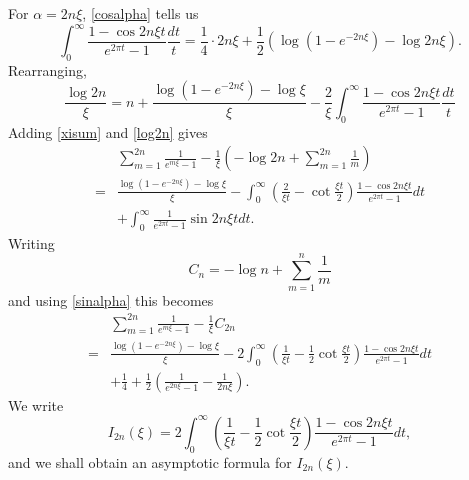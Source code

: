 \documentclass{article}
\begin{document}
For $\alpha = 2n\xi$, \eqref{cosalpha} tells us
\[
\int_0^\infty \frac{1-\cos 2n\xi t}{e^{2\pi t}-1} \frac{dt}{t} = \frac{1}{4}\cdot 2n\xi + \frac{1}{2}\left( \log(1-e^{-2n\xi})-\log 2n\xi\right).
\]
Rearranging, 
\begin{equation}
\frac{\log 2n}{\xi} = n + \frac{\log(1-e^{-2n \xi})-\log \xi}{\xi} -\frac{2}{\xi}
\int_0^\infty \frac{1-\cos 2n\xi t}{e^{2\pi t}-1} \frac{dt}{t}
\label{log2n}
\end{equation}
Adding \eqref{xisum} and \eqref{log2n} gives
\[
\begin{split}
&\sum_{m=1}^{2n} \frac{1}{e^{m\xi}-1} - \frac{1}{\xi} \left( - \log 2n+\sum_{m=1}^{2n} \frac{1}{m}  \right)\\
=& \frac{\log(1-e^{-2n \xi})-\log \xi}{\xi}
-\int_0^\infty \left(\frac{2}{\xi t}-\cot \frac{\xi t}{2} \right) \frac{1-\cos 2n\xi t}{e^{2\pi t}-1} dt\\
&+\int_0^\infty \frac{1}{e^{2\pi t}-1}  \sin 2n\xi t dt.
\end{split}
\]
Writing
\[
C_n = -\log n + \sum_{m=1}^n \frac{1}{m}
\]
and using \eqref{sinalpha} this becomes
\[
\begin{split}
&\sum_{m=1}^{2n} \frac{1}{e^{m\xi}-1} - \frac{1}{\xi} C_{2n}\\
=&\frac{\log(1-e^{-2n \xi})-\log \xi}{\xi}
-2\int_0^\infty \left(\frac{1}{\xi t}-\frac{1}{2}\cot \frac{\xi t}{2} \right) \frac{1-\cos 2n\xi t}{e^{2\pi t}-1} dt\\
&+\frac{1}{4}+\frac{1}{2}\left( \frac{1}{e^{2n \xi}-1}-\frac{1}{2n\xi}\right).
\end{split}
\]
We write
\[
I_{2n}(\xi) = 2\int_0^\infty \left(\frac{1}{\xi t}-\frac{1}{2}\cot \frac{\xi t}{2} \right) \frac{1-\cos 2n\xi t}{e^{2\pi t}-1} dt,
\]
and we shall obtain an asymptotic formula for $I_{2n}(\xi)$.
\end{document}
